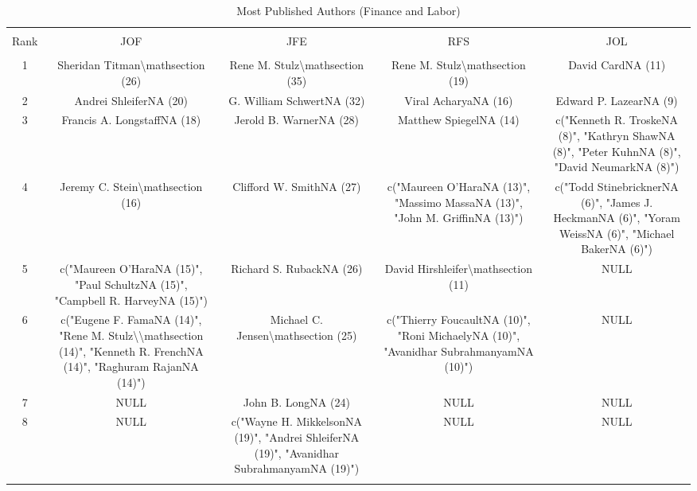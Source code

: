 
\begin{table}[!htbp] \centering 
  \caption{Most Published Authors (Finance and Labor)} 
  \label{} 
\footnotesize 
\begin{tabular}{@{\extracolsep{5pt}} ccccc} 
\\[-1.8ex]\hline 
\hline \\[-1.8ex] 
Rank & JOF & JFE & RFS & JOL \\ 
\hline \\[-1.8ex] 
1 & Sheridan Titman\textbackslash mathsection (26) & Rene M. Stulz\textbackslash mathsection (35) & Rene M. Stulz\textbackslash mathsection (19) & David CardNA (11) \\ 
2 & Andrei ShleiferNA (20) & G. William SchwertNA (32) & Viral AcharyaNA (16) & Edward P. LazearNA (9) \\ 
3 & Francis A. LongstaffNA (18) & Jerold B. WarnerNA (28) & Matthew SpiegelNA (14) & c("Kenneth R. TroskeNA (8)", "Kathryn ShawNA (8)", "Peter KuhnNA (8)", "David NeumarkNA (8)") \\ 
4 & Jeremy C. Stein\textbackslash mathsection (16) & Clifford W. SmithNA (27) & c("Maureen O'HaraNA (13)", "Massimo MassaNA (13)", "John M. GriffinNA (13)") & c("Todd StinebricknerNA (6)", "James J. HeckmanNA (6)", "Yoram WeissNA (6)", "Michael BakerNA (6)") \\ 
5 & c("Maureen O'HaraNA (15)", "Paul SchultzNA (15)", "Campbell R. HarveyNA (15)") & Richard S. RubackNA (26) & David Hirshleifer\textbackslash mathsection (11) & NULL \\ 
6 & c("Eugene F. FamaNA (14)", "Rene M. Stulz\textbackslash \textbackslash mathsection (14)", "Kenneth R. FrenchNA (14)", "Raghuram RajanNA (14)") & Michael C. Jensen\textbackslash mathsection (25) & c("Thierry FoucaultNA (10)", "Roni MichaelyNA (10)", "Avanidhar SubrahmanyamNA (10)") & NULL \\ 
7 & NULL & John B. LongNA (24) & NULL & NULL \\ 
8 & NULL & c("Wayne H. MikkelsonNA (19)", "Andrei ShleiferNA (19)", "Avanidhar SubrahmanyamNA (19)") & NULL & NULL \\ 
\hline \\[-1.8ex] 
\end{tabular} 
\end{table} 
